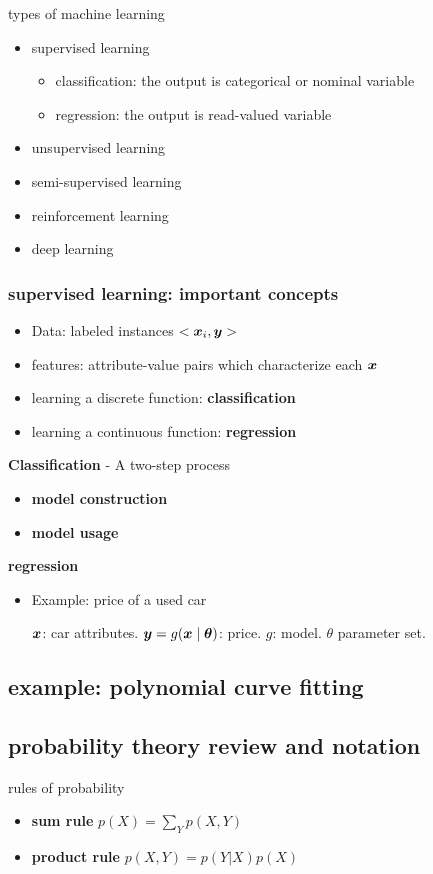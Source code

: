 \documentclass[11pt]{article}
\begin{document}
types of machine learning
\begin{itemize}
\item supervised learning
\begin{itemize}
\item classification: the output is categorical or nominal variable
\item regression: the output is read-valued variable
\end{itemize}
\item unsupervised learning
\item semi-supervised learning
\item reinforcement learning
\item deep learning
\end{itemize}
\subsubsection{supervised learning: important concepts}
\label{sec:orgd148b47}
\begin{itemize}
\item Data: labeled instances \(<\boldsymbol{x}_i,\boldsymbol{y}>\)
\item features: attribute-value pairs which characterize each \(\boldsymbol{x}\)
\item learning a discrete function: \textbf{classification}
\item learning a continuous function: \textbf{regression}
\end{itemize}

\textbf{Classification} - A two-step process
\begin{itemize}
\item \textbf{model construction}
\item \textbf{model usage}
\end{itemize}

\textbf{regression}
\begin{itemize}
\item Example: price of a used car

\(\boldsymbol{x}\): car attributes. \(\boldsymbol{y}=g(\boldsymbol{x}\mid\boldsymbol{\theta})\): price. \(g\):
model. \(\theta\) parameter set.
\end{itemize}
\subsection{example: polynomial curve fitting}
\label{sec:orgc129115}
\subsection{probability theory review and notation}
\label{sec:org859dde0}
rules of probability
\begin{itemize}
\item \textbf{sum rule} \(p(X)=\displaystyle\sum_Yp(X,Y)\)
\item \textbf{product rule} \(p(X,Y)=p(Y|X)p(X)\)
\end{itemize}
\end{document}
